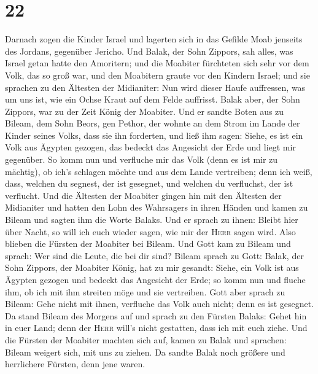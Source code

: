\hypertarget{section-21}{%
\section{22}\label{section-21}}

 Darnach zogen die Kinder Israel und lagerten sich in das
Gefilde Moab jenseits des Jordans, gegenüber Jericho.  Und
Balak, der Sohn Zippors, sah alles, was Israel getan hatte den
Amoritern;  und die Moabiter fürchteten sich sehr vor dem
Volk, das so groß war, und den Moabitern graute vor den Kindern Israel;
 und sie sprachen zu den Ältesten der Midianiter: Nun wird
dieser Haufe auffressen, was um uns ist, wie ein Ochse Kraut auf dem
Felde auffrisst. Balak aber, der Sohn Zippors, war zu der Zeit König der
Moabiter.  Und er sandte Boten aus zu Bileam, dem Sohn
Beors, gen Pethor, der wohnte an dem Strom im Lande der Kinder seines
Volks, dass sie ihn forderten, und ließ ihm sagen: Siehe, es ist ein
Volk aus Ägypten gezogen, das bedeckt das Angesicht der Erde und liegt
mir gegenüber.  So komm nun und verfluche mir das Volk
(denn es ist mir zu mächtig), ob ich's schlagen möchte und aus dem Lande
vertreiben; denn ich weiß, dass, welchen du segnest, der ist gesegnet,
und welchen du verfluchst, der ist verflucht.  Und die
Ältesten der Moabiter gingen hin mit den Ältesten der Midianiter und
hatten den Lohn des Wahrsagers in ihren Händen und kamen zu Bileam und
sagten ihm die Worte Balaks.  Und er sprach zu ihnen:
Bleibt hier über Nacht, so will ich euch wieder sagen, wie mir der
\textsc{Herr} sagen wird. Also blieben die Fürsten der Moabiter bei
Bileam.  Und Gott kam zu Bileam und sprach: Wer sind die
Leute, die bei dir sind?  Bileam sprach zu Gott: Balak,
der Sohn Zippors, der Moabiter König, hat zu mir gesandt:
 Siehe, ein Volk ist aus Ägypten gezogen und bedeckt das
Angesicht der Erde; so komm nun und fluche ihm, ob ich mit ihm streiten
möge und sie vertreiben.  Gott aber sprach zu Bileam:
Gehe nicht mit ihnen, verfluche das Volk auch nicht; denn es ist
gesegnet.  Da stand Bileam des Morgens auf und sprach zu
den Fürsten Balaks: Gehet hin in euer Land; denn der \textsc{Herr}
will's nicht gestatten, dass ich mit euch ziehe.  Und die
Fürsten der Moabiter machten sich auf, kamen zu Balak und sprachen:
Bileam weigert sich, mit uns zu ziehen.  Da sandte Balak
noch größere und herrlichere Fürsten, denn jene waren. 
